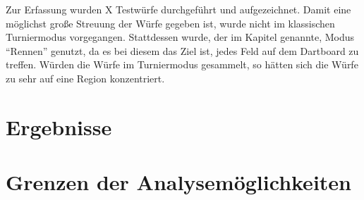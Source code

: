 Zur Erfassung wurden X  Testwürfe durchgeführt und aufgezeichnet. Damit eine möglichst große Streuung der Würfe gegeben ist, wurde nicht im klassischen Turniermodus vorgegangen. Stattdessen wurde, der im Kapitel  genannte, Modus "`Rennen"' genutzt, da es bei diesem das Ziel ist, jedes Feld auf dem Dartboard zu treffen. Würden die Würfe im Turniermodus gesammelt, so hätten sich die Würfe zu sehr auf eine Region konzentriert.
\section{Ergebnisse}
\label{sec:results}


\section{Grenzen der Analysemöglichkeiten}

